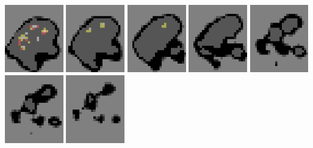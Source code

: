 \documentclass[10pt]{book}
\begin{document}
\begin{center}
\includegraphics[width=0.19\textwidth]{previews/nightstrike_1-FIRE-05.png}
\includegraphics[width=0.19\textwidth]{previews/nightstrike_1-FIRE-06.png}
\includegraphics[width=0.19\textwidth]{previews/nightstrike_1-FIRE-07.png}
\includegraphics[width=0.19\textwidth]{previews/nightstrike_1-FIRE-08.png}
\includegraphics[width=0.19\textwidth]{previews/nightstrike_1-FIRE-09.png}
\includegraphics[width=0.19\textwidth]{previews/nightstrike_1-FIRE-10.png}
\includegraphics[width=0.19\textwidth]{previews/nightstrike_1-FIRE-11.png}

\end{center}
\end{document}
